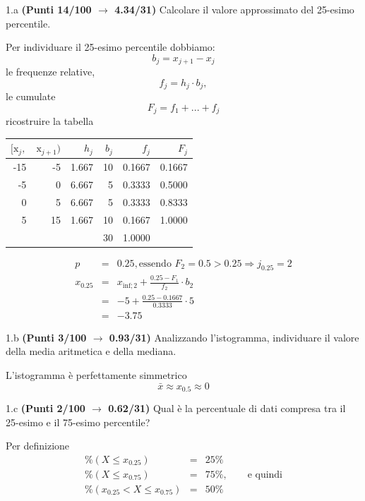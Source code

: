\documentclass[
  11pt,
]{book}
\theoremstyle{mytheoremstyle}
\theoremstyle{mydefstyle}
\newenvironment{sol}
  {
  \begin{tcolorbox}[enhanced,breakable,arc=0.1mm,boxrule=1pt,colback=white,colframe=iblue,
  title=\bf \fontfamily{lmss}\selectfont \hspace{.5 cm} Soluzione,drop fuzzy shadow]

}{
\end{tcolorbox}
  }
\begin{document}
1.a \textbf{(Punti 14/100 \(\rightarrow\) 4.34/31)} Calcolare il valore approssimato del 25-esimo percentile.

\begin{sol}
Per individuare il 25-esimo percentile dobbiamo:
\[
b_j=x_{j+1}-x_{j}
\]
le frequenze relative,
\[
f_j=h_j\cdot b_j,
\]
le cumulate
\[
F_j=f_1+...+f_j
\]
ricostruire la tabella

\begin{table}[H]
\centering
\begin{tabular}{rrrrrr}
\toprule
$[\text{x}_j,$ & $\text{x}_{j+1})$ & $h_j$ & $b_j$ & $f_j$ & $F_j$\\
\midrule
-15 & -5 & 1.667 & 10 & 0.1667 & 0.1667\\
-5 & 0 & 6.667 & 5 & 0.3333 & 0.5000\\
0 & 5 & 6.667 & 5 & 0.3333 & 0.8333\\
5 & 15 & 1.667 & 10 & 0.1667 & 1.0000\\
 &  &  & 30 & 1.0000 & \\
\bottomrule
\end{tabular}
\end{table}

\begin{eqnarray*}
  p &=&  0.25 , \text{essendo }F_{ 2 }= 0.5  > 0.25  \Rightarrow j_{ 0.25 }= 2 \\
  x_{ 0.25 } &=& x_{\text{inf}; 2 } + \frac{ { 0.25 } - F_{ 1 }} {f_{ 2 }} \cdot b_{ 2 } \\
            &=&  -5  + \frac {{ 0.25 } -  0.1667 } { 0.3333 } \cdot  5  \\
            &=&  -3.75 
\end{eqnarray*}

\end{sol}

1.b \textbf{(Punti 3/100 \(\rightarrow\) 0.93/31)} Analizzando l'istogramma, individuare il valore della media aritmetica e della mediana.

\begin{sol}
L'istogramma è perfettamente simmetrico
\[
\bar x\approx x_{0.5}\approx 0
\]

\end{sol}

1.c \textbf{(Punti 2/100 \(\rightarrow\) 0.62/31)} Qual è la percentuale di dati compresa tra il 25-esimo e il 75-esimo percentile?

\begin{sol}
Per definizione
\begin{eqnarray*}
\%(X\le x_{0.25})&=&25\%\\
\%(X\le x_{0.75})&=&75\%, \qquad\text{e quindi}\\
\%(x_{0.25}< X\le x_{0.75})&=&50\%
\end{eqnarray*}

\end{sol}
\end{document}
